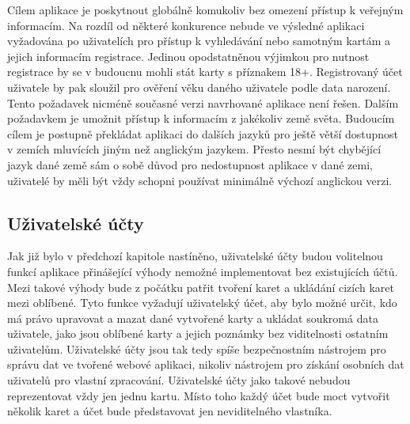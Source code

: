 	Cílem aplikace je poskytnout globálně komukoliv bez omezení přístup k veřejným informacím.
	Na rozdíl od některé konkurence nebude ve výsledné aplikaci vyžadována po uživatelích pro přístup k vyhledávání
	nebo samotným kartám a jejich informacím registrace.
	Jedinou opodstatněnou výjimkou pro nutnost registrace by se v budoucnu mohli stát karty s příznakem 18+.
	Registrovaný účet uživatele by pak sloužil pro ověření věku daného uživatele podle data narození.
	Tento požadavek nicméně současné verzi navrhované aplikace není řešen.
	Dalším požadavkem je umožnit přístup k informacím z jakékoliv země světa.
	Budoucím cílem je postupně překládat aplikaci do dalších jazyků pro ještě větší dostupnost v zemích mluvících
	jiným než anglickým jazykem.
	Přesto nesmí být chybějící jazyk dané země sám o sobě důvod pro nedostupnost aplikace v dané zemi, uživatelé by
	měli být vždy schopni používat minimálně výchozí anglickou verzi.

	\subsection{Uživatelské účty}

	Jak již bylo v předchozí kapitole nastíněno, uživatelské účty budou volitelnou funkcí aplikace přinášející výhody
	nemožné implementovat bez existujících účtů.
	Mezi takové výhody bude z počátku patřit tvoření karet a ukládání cizích karet mezi oblíbené.
	Tyto funkce vyžadují uživatelský účet, aby bylo možné určit, kdo má právo upravovat a mazat dané vytvořené karty
	a ukládat soukromá data uživatele, jako jsou oblíbené karty a jejich poznámky bez viditelnosti ostatním uživatelům.
	Uživatelské účty jsou tak tedy spíše bezpečnostním nástrojem pro správu dat ve tvořené webové aplikaci, nikoliv
	nástrojem pro získání osobních dat uživatelů pro vlastní zpracování.
	Uživatelské účty jako takové nebudou reprezentovat vždy jen jednu kartu.
	Místo toho každý účet bude moct vytvořit několik karet a účet bude představovat jen neviditelného vlastníka.

